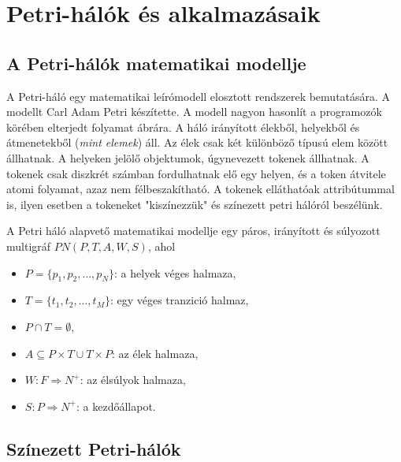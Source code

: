 \chapter{Petri-hálók és alkalmazásaik}

\section{A Petri-hálók matematikai modellje}

A Petri-háló egy matematikai leírómodell elosztott rendszerek bemutatására.
A modellt Carl Adam Petri készítette.
A modell nagyon hasonlít a programozók körében elterjedt folyamat ábrára.
A háló irányított élekből, helyekből és átmenetekből (\textsl{mint elemek}) áll.
Az élek csak két különböző típusú elem között állhatnak.
A helyeken jelölő objektumok, úgynevezett tokenek állhatnak.
A tokenek csak diszkrét számban fordulhatnak elő egy helyen, és a token átvitele atomi folyamat, azaz nem félbeszakítható.
A tokenek elláthatóak attribútummal is, ilyen esetben a tokeneket "kiszínezzük" és színezett petri hálóról beszélünk. %

A Petri háló alapvető matematikai modellje egy páros, irányított és súlyozott multigráf $PN(P,T,A,W,S)$, ahol 
\begin{itemize}
\item $P=\{ p_1,p_2,\ldots ,p_N \}$: a helyek véges halmaza,
\item $T=\{ t_1,t_2,\ldots ,t_M\}$: egy véges tranzició halmaz,
\item $P\cap T = \emptyset$,
\item $A \subseteq P\times T \cup T\times P$: az élek halmaza,
\item $W: F\Rightarrow N^+$: az élsúlyok halmaza,
\item $S: P\Rightarrow N^+$: a kezdőállapot.
\end{itemize}

\section{Színezett Petri-hálók}

